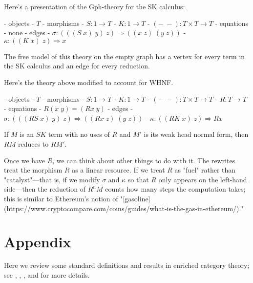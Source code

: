 \documentclass[a4paper,UKenglish]{article}
\begin{document}


Here's a presentation of the Gph-theory for the SK calculus:

- objects
  - $T$
- morphisms
  - $S\colon 1 \to T$
  - $K\colon 1 \to T$
  - $(-\; -)\colon T \times T \to T$
- equations
  - none
- edges
  - $\sigma\colon (((S\; x)\; y)\; z) \Rightarrow ((x\; z)\; (y\; z))$
  - $\kappa\colon ((K\; x)\; z) \Rightarrow x$

The free model of this theory on the empty graph has a vertex for every term in the SK calculus and an edge for every reduction.


Here's the theory above modified to account for WHNF.

- objects
  - $T$
- morphisms
  - $S\colon 1 \to T$
  - $K\colon 1 \to T$
  - $(-\; -)\colon T \times T \to T$
  - $R\colon T \to T$
- equations
  - $R(x\; y) = (Rx\; y)$
- edges
  - $\sigma\colon (((RS\; x)\; y)\; z) \Rightarrow ((Rx\; z)\; (y\; z))$
  - $\kappa\colon ((RK\; x)\; z) \Rightarrow Rx$

If $M$ is an $SK$ term with no uses of $R$ and $M'$ is its weak head normal form, then $RM$ reduces to $RM'.$

Once we have $R$, we can think about other things to do with it.  The rewrites treat the morphism $R$ as a linear resource.  If we treat $R$ as "fuel" rather than "catalyst"---that is, if we modify $\sigma$ and $\kappa$ so that $R$ only appears on the left-hand side---then the
reduction of $R^nM$ counts how many steps the computation takes; this is similar to Ethereum's notion of "[gasoline](https://www.cryptocompare.com/coins/guides/what-is-the-gas-in-ethereum/)."

\section{Appendix}
Here we review some standard definitions and results in enriched category theory; see \cite{CIS-335497}, \cite{Power99EnrichedLawvereTheories}, \cite{DBLP:journals/acs/LackR11}, and \cite{Trimble} for more details.
\end{document}
